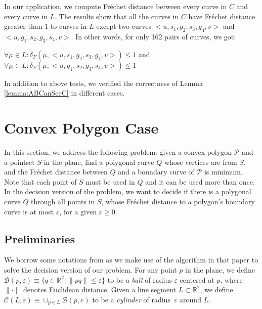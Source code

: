 \documentclass[a4paper,UKenglish]{lipics}
\newcommand{\IR}{\ensuremath{\mathbb{R}}}
\newcommand{\lee}{\leqslant}
\newcommand{\gee}{\geqslant}
\newcommand{\eps}{\varepsilon}
\newcommand{\CB}{{\mathscr B}}
\newcommand{\CC}{{\mathscr C}}
\newcommand{\Pol}{{\mathscr P}}
\newcommand{\Frechet}{Fr\'echet }
\newcommand{\distF}{\delta_F}
\newcommand{\pset}{S}
\begin{document}
In our application, we compute \Frechet distance between every curve in $C$ and every curve in  $L$. 
The results show that all the curves in $C$
have \Frechet distance greater than $1$ to curves 
in $L$ except two curves $<u,s_1,g_2,s_3,g_4,v>$
and $<u,g_1,s_2,g_3,s_4,v>$. In other words,  
for only 162 pairs of curves, we got:

 $\forall \mu \in L: \distF( \mu , <u,s_1,g_2,s_3,g_4,v>  ) \le 1$  and
 $\forall \mu \in L: \distF( \mu , <u,g_1,s_2,g_3,s_4,v>  ) \le 1$  

In addition to above tests, we verified the correctness of 
Lemma \ref{lemma:ABCanSeeC} in different cases. 








\newcommand{\bounC}[1]{{\sigma(\Pol,{#1})}}
\section {Convex Polygon Case}
\label{sec:SpecialCase}

In this section, we address the following problem:
given a convex polygon $\Pol$ and a pointset $\pset$ in
the plane, 
find a polygonal curve $Q$ whose vertices are from $\pset$,
and the \Frechet distance between $Q$
and a boundary curve of $\Pol$ is minimum.
Note that each point of $\pset$ must be used in $Q$ and it  
can be used more than once. 
In the decision version of the problem,
we want to decide if there is a polygonal curve $Q$ through all points in  
$\pset$, 
whose \Frechet distance to a polygon's boundary curve 
is at most $\eps$, for a given $\eps \gee 0$. 





\subsection{Preliminaries}
\label{subsec:preliminaries}

We borrow some notations 
from \cite{cccg11}
as we make use of the algorithm in that paper
to solve the decision version of our problem.
For any point $p$ in the plane,
we define $\CB(p,\eps) \equiv \{q \in \IR^2 : \|pq\| \lee \eps\}$
to be a \emph{ball} of radius $\eps$ centered at $p$,
where $\|\cdot\|$ denotes  Euclidean distance.
Given a line segment $L \subset \IR^2$,
we define $\CC(L, \eps) \equiv \cup_{p\in L} \CB(p,\eps)$
to be a \emph{cylinder} of radius~$\eps$ around $L$.
\end{document}
